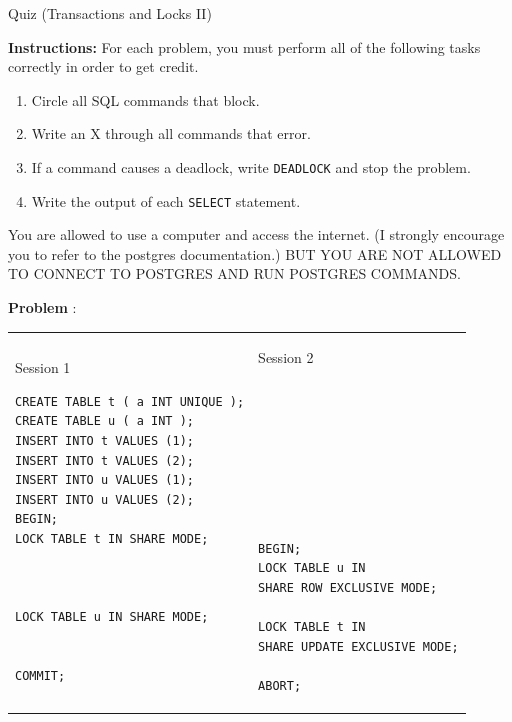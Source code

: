 \documentclass[10pt]{article}
\theoremstyle{definition}
\newcounter{ProblemCounter}
\newcommand{\nextproblem}{\filbreak\stepcounter{ProblemCounter} \noindent\textbf{Problem \theProblemCounter}:}
\begin{document}
\begin{center}
{
\Large
    Quiz (Transactions and Locks II)
}

    \vspace{0.1in}
\end{center}

\noindent
\textbf{Instructions:}
For each problem, you must perform all of the following tasks correctly in order to get credit.
\begin{enumerate}
\item Circle all SQL commands that block.
\item Write an X through all commands that error.
\item If a command causes a deadlock, write \lstinline{DEADLOCK} and stop the problem.
\item Write the output of each \lstinline{SELECT} statement.
\end{enumerate}
You are allowed to use a computer and access the internet.
(I strongly encourage you to refer to the postgres documentation.)
BUT YOU ARE NOT ALLOWED TO CONNECT TO POSTGRES AND RUN POSTGRES COMMANDS.

\vspace{1in}

\nextproblem
\begin{tcolorbox}
\begin{tabular}{p{3.25in}p{3in}}
\hspace{-0.2in}Session 1
\begin{lstlisting}
CREATE TABLE t ( a INT UNIQUE );
CREATE TABLE u ( a INT );
INSERT INTO t VALUES (1);
INSERT INTO t VALUES (2);
INSERT INTO u VALUES (1);
INSERT INTO u VALUES (2);
BEGIN;
LOCK TABLE t IN SHARE MODE;
  


LOCK TABLE u IN SHARE MODE;


COMMIT;
\end{lstlisting}
    &
\hspace{-0.2in}Session 2
\begin{lstlisting}








BEGIN;
LOCK TABLE u IN
SHARE ROW EXCLUSIVE MODE;

LOCK TABLE t IN
SHARE UPDATE EXCLUSIVE MODE;

ABORT;

\end{lstlisting}
\end{tabular}
\end{tcolorbox}
\vspace{0.25in}
\end{document}

